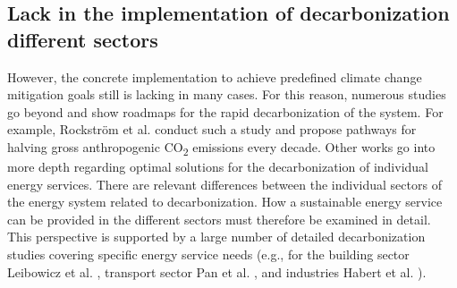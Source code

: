 \subsection{Lack in the implementation of decarbonization different sectors}
However, the concrete implementation to achieve predefined climate change mitigation goals still is lacking in many cases. For this reason, numerous studies go beyond and show roadmaps for the rapid decarbonization of the system. For example, Rockstr{\"o}m et al. \cite{rockstrom2017roadmap} conduct such a study and propose pathways for halving gross anthropogenic CO\textsubscript{2} emissions every decade. Other works go into more depth regarding optimal solutions for the decarbonization of individual energy services. There are relevant differences between the individual sectors of the energy system related to decarbonization. How a sustainable energy service can be provided in the different sectors must therefore be examined in detail. This perspective is supported by a large number of detailed decarbonization studies covering specific energy service needs (e.g., for the building sector Leibowicz et al. \cite{leibowicz2018optimal}, transport sector Pan et al. \cite{pan2018decarbonization}, and industries Habert et al. \cite{habert2020environmental}).\vspace{0.3cm}

